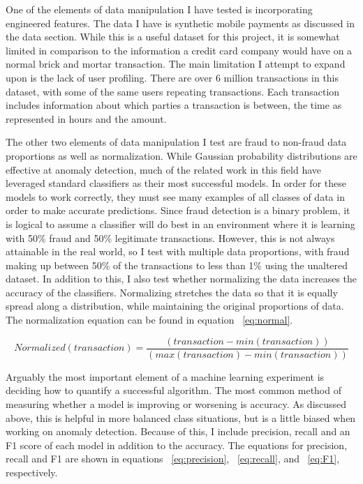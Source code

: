 \documentclass[midd]{thesis}
\begin{document}
One of the elements of data manipulation I have tested is incorporating engineered features. The data I have is synthetic mobile payments as discussed in the data section. While this is a useful dataset for this project, it is somewhat limited in comparison to the information a credit card company would have on a normal brick and mortar transaction. The main limitation I attempt to expand upon is the lack of user profiling. There are over 6 million transactions in this dataset, with some of the same users repeating transactions. Each transaction includes information about which parties a transaction is between, the time as represented in hours and the amount. 

The other two elements of data manipulation I test are fraud to non-fraud data proportions as well as normalization. While Gaussian probability distributions are effective at anomaly detection, much of the related work in this field have leveraged standard classifiers as their most successful models. In order for these models to work correctly, they must see many examples of all classes of data in order to make accurate predictions. Since fraud detection is a binary problem, it is logical to assume a classifier will do best in an environment where it is learning with 50\% fraud and 50\% legitimate transactions. However, this is not always attainable in the real world, so I test with multiple data proportions, with fraud making up between 50\% of the transactions to less than 1\% using the unaltered dataset. In addition to this, I also test whether normalizing the data increases the accuracy of the classifiers. Normalizing stretches the data so that it is equally spread along a distribution, while maintaining the original proportions of data. The normalization equation can be found in equation ~\ref{eq:normal}. 


\begin{equation}
\label{eq:normal}
Normalized(transaction) = \frac{( transaction - min(transaction))}{  (max(transaction) - min(transaction))}
\end{equation}

Arguably the most important element of a machine learning experiment is deciding how to quantify a successful algorithm. The most common method of measuring whether a model is improving or worsening is accuracy. As discussed above, this is helpful in more balanced class situations, but is a little biased when working on anomaly detection. Because of this, I include precision, recall and an F1 score of each model in addition to the accuracy. The equations for precision, recall and F1 are shown in equations ~\ref{eq:precision}, ~\ref{eq:recall}, and ~\ref{eq:F1}, respectively. 
\end{document}
